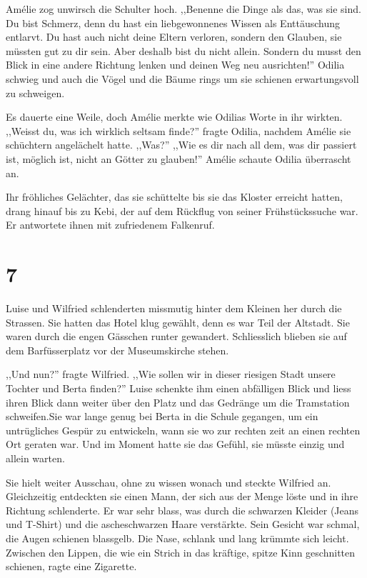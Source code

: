 Amélie zog unwirsch die Schulter hoch. ,,Benenne die Dinge als das, was sie sind. Du bist Schmerz, denn du hast ein liebgewonnenes Wissen als Enttäuschung entlarvt. Du hast auch nicht deine Eltern verloren, sondern den Glauben, sie müssten gut zu dir sein. Aber deshalb bist du nicht allein. Sondern du musst den Blick in eine andere Richtung lenken und deinen Weg neu ausrichten!'' Odilia schwieg und auch die Vögel und die Bäume rings um sie schienen erwartungsvoll zu schweigen.

Es dauerte eine Weile, doch Amélie merkte wie Odilias Worte in ihr wirkten. ,,Weisst du, was ich wirklich seltsam finde?'' fragte Odilia, nachdem Amélie sie schüchtern angelächelt hatte. ,,Was?'' ,,Wie es dir nach all dem, was dir passiert ist, möglich ist, nicht an Götter zu glauben!'' Amélie schaute Odilia überrascht an.

Ihr fröhliches Gelächter, das sie schüttelte bis sie das Kloster erreicht hatten, drang hinauf bis zu Kebi, der auf dem Rückflug von seiner Frühstückssuche war. Er antwortete ihnen mit zufriedenem Falkenruf.

\section*{7}

Luise und Wilfried schlenderten missmutig hinter dem Kleinen her durch die Strassen. Sie hatten das Hotel klug gewählt, denn es war Teil der Altstadt. Sie waren durch die engen Gässchen runter gewandert. Schliesslich blieben sie auf dem Barfüsserplatz vor der Museumskirche stehen. 

,,Und nun?'' fragte Wilfried. ,,Wie sollen wir in dieser riesigen Stadt unsere Tochter und Berta finden?'' Luise schenkte ihm einen abfälligen Blick und liess ihren Blick dann weiter über den Platz und das Gedränge um die Tramstation schweifen.Sie war lange genug bei Berta in die Schule gegangen, um ein untrügliches Gespür zu entwickeln, wann sie wo zur rechten zeit an einen rechten Ort geraten war. Und im Moment hatte sie das Gefühl, sie müsste einzig und allein warten. 

Sie hielt weiter Ausschau, ohne zu wissen wonach und steckte Wilfried an. Gleichzeitig entdeckten sie einen Mann, der sich aus der Menge löste und in ihre Richtung schlenderte. Er war sehr blass, was durch die schwarzen Kleider (Jeans und T-Shirt) und die ascheschwarzen Haare verstärkte. Sein Gesicht war schmal, die Augen schienen blassgelb. Die Nase, schlank und lang krümmte sich leicht. Zwischen den Lippen, die wie ein Strich in das kräftige, spitze Kinn geschnitten schienen, ragte eine Zigarette.


